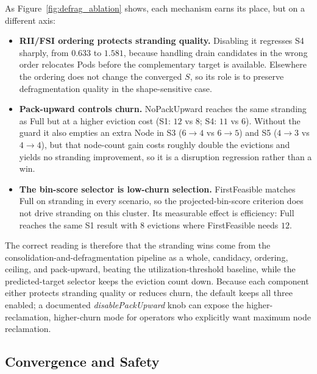 As Figure~\ref{fig:defrag_ablation} shows, each mechanism earns its place, but on a different axis:

\begin{itemize}
    \item \textbf{RII/FSI ordering protects stranding quality.} Disabling it regresses S4 sharply, from \(0.633\) to \(1.581\), because handling drain candidates in the wrong order relocates Pods before the complementary target is available. Elsewhere the ordering does not change the converged \(S\), so its role is to preserve defragmentation quality in the shape-sensitive case.
    \item \textbf{Pack-upward controls churn.} NoPackUpward reaches the same stranding as Full but at a higher eviction cost (S1: \(12\) vs \(8\); S4: \(11\) vs \(6\)). Without the guard it also empties an extra Node in S3 (\(6 \rightarrow 4\) vs \(6 \rightarrow 5\)) and S5 (\(4 \rightarrow 3\) vs \(4 \rightarrow 4\)), but that node-count gain costs roughly double the evictions and yields no stranding improvement, so it is a disruption regression rather than a win.
    \item \textbf{The bin-score selector is low-churn selection.} FirstFeasible matches Full on stranding in every scenario, so the projected-bin-score criterion does not drive stranding on this cluster. Its measurable effect is efficiency: Full reaches the same S1 result with \(8\) evictions where FirstFeasible needs \(12\).
\end{itemize}

The correct reading is therefore that the stranding wins come from the consolidation-and-defragmentation pipeline as a whole, candidacy, ordering, ceiling, and pack-upward, beating the utilization-threshold baseline, while the predicted-target selector keeps the eviction count down. Because each component either protects stranding quality or reduces churn, the default keeps all three enabled; a documented \textit{disablePackUpward} knob can expose the higher-reclamation, higher-churn mode for operators who explicitly want maximum node reclamation.

\subsection{Convergence and Safety}
\label{sec:defrag_convergence_safety}

